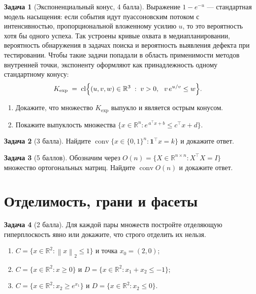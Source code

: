 \documentclass[11pt]{article}
\theoremstyle{definition}
\newtheorem{problem}{Задача}
\theoremstyle{remark}
\DeclareMathOperator{\conv}{conv}
\newcommand{\R}{\mathbb{R}}
\newcommand{\norm}[1]{\left\lVert #1 \right\rVert}
\newcommand{\ones}{\mathbf{1}}
\begin{document}
\begin{problem}[Экспоненциальный конус, 4 балла]
Выражение $1 - e^{-u}$ --- стандартная модель насыщения: если события идут пуассоновским потоком с интенсивностью, пропорциональной вложенному усилию $u$, то это вероятность хотя бы одного успеха.
Так устроены кривые охвата в медиапланировании, вероятность обнаружения в задачах поиска и вероятность выявления дефекта при тестировании. Чтобы такие задачи попадали в область применимости методов внутренней точки, экспоненту оформляют как принадлежность одному стандартному конусу:
\[
K_{\exp} \;=\; \operatorname{cl}\Bigl\{ (u, v, w) \in \R^{3} \;:\; v > 0,\ \ v\, e^{u/v} \le w \Bigr\} .
\]
\begin{enumerate}[label=(\alph*), nosep]
  \item Докажите, что множество $K_{\exp}$ выпукло и является острым конусом.
  \item Покажите выпуклость множества $\{x \in \R^{n} : e^{\,a^{\top} x + b} \le c^{\top} x + d\}$.
\end{enumerate}
\end{problem}

\begin{problem}[3 балла]
Найдите $\conv\{x \in \{0,1\}^{n} : \ones^{\top} x = k\}$ и докажите ответ.
\end{problem}

\begin{problem}[5 баллов]
Обозначим через $O(n) = \{X \in \R^{n\times n} : X^{\top} X = I\}$ множество ортогональных матриц.
Найдите $\conv O(n)$ и докажите ответ.
\end{problem}

\section{Отделимость, грани и фасеты}

\begin{problem}[2 балла]
Для каждой пары множеств постройте отделяющую гиперплоскость явно или докажите, что строго
отделить их нельзя.
\begin{enumerate}[label=(\alph*), nosep]
  \item $C = \{x \in \R^{2} : \norm{x}_2 \le 1\}$ и точка $x_0 = (2, 0)$;
  \item $C = \{x \in \R^{2} : x \ge 0\}$ и $D = \{x \in \R^{2} : x_1 + x_2 \le -1\}$;
  \item $C = \{x \in \R^{2} : x_2 \ge e^{x_1}\}$ и $D = \{x \in \R^{2} : x_2 \le 0\}$.
\end{enumerate}
\end{problem}
\end{document}
